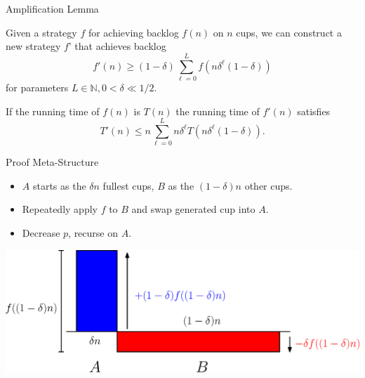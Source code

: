 \documentclass[xcolor=x11names, svgnames, rgb]{beamer}
\begin{document}
\begin{frame}[t]{Amplification Lemma}
  \begin{lemma}
    Given a strategy $f$ for achieving backlog
    $f(n)$ on $n$ cups, we can construct a new
    strategy $f$' that achieves backlog 
    $$f'(n) \ge (1-\delta)\sum_{\ell=0}^L f(n\delta^\ell(1-\delta))$$
    for parameters $L\in\mathbb{N}, 0<\delta\ll 1/2$.

    If the running time of $f(n)$ is $T(n)$ the running time of $f'(n)$ satisfies
    $$T'(n) \le n\sum_{\ell=0}^L n\delta^\ell T(n\delta^\ell(1-\delta)).$$
  \end{lemma}
\end{frame}

\begin{frame}[t]{Proof Meta-Structure}
  \begin{itemize}
    \item $A$ starts as the $\delta n$ fullest cups, $B$ as the $(1-\delta)n$ other cups.
    \item Repeatedly apply $f$ to $B$ and swap generated cup into $A$. 
    \item Decrease $p$, recurse on $A$.
  \end{itemize} 
  \vspace{0.5cm}
  \includegraphics[width=\linewidth]{amplificationImgs/delta_one_minus_delta.eps}
\end{frame}
\end{document}
